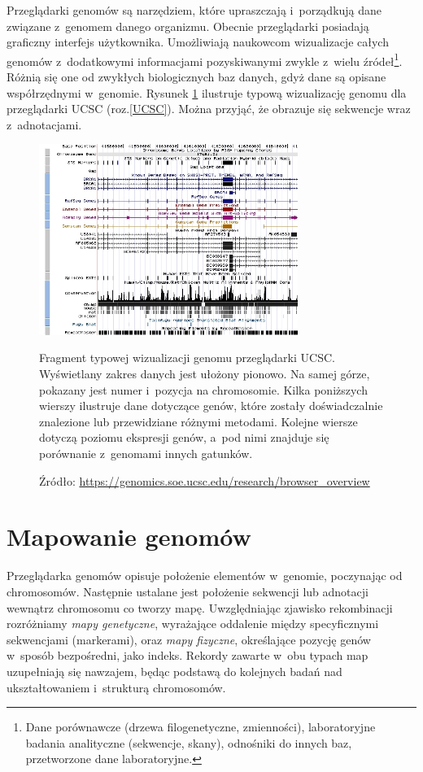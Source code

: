 \documentclass[a4paper,12pt,oneside]{mwrep}  %
\begin{document}
Przeglądarki genomów są narzędziem, które upraszczają i~porządkują dane związane z~genomem danego organizmu. Obecnie przeglądarki posiadają graficzny interfejs użytkownika. Umożliwiają naukowcom wizualizacje całych genomów z~dodatkowymi informacjami pozyskiwanymi zwykle z~wielu źródeł\footnote{Dane porównawcze (drzewa filogenetyczne, zmienności), laboratoryjne badania analityczne (sekwencje, skany), odnośniki do innych baz, przetworzone dane laboratoryjne.}. Różnią się one od zwykłych biologicznych baz danych, gdyż dane są opisane współrzędnymi w~genomie. Rysunek \ref{przykladowa-przegladarka-genomu} ilustruje typową wizualizację genomu dla przeglądarki UCSC (roz.\ref{UCSC}). Można przyjąć, że obrazuje się sekwencje wraz z~adnotacjami.

\begin{figure}[h]
\centering
\includegraphics[width=0.75\textwidth]{grafika/browsershot_ucsc}
\caption{Fragment typowej wizualizacji genomu przeglądarki UCSC. Wyświetlany zakres danych jest ułożony pionowo. Na samej górze, pokazany jest numer i~pozycja na chromosomie. Kilka poniższych wierszy ilustruje dane dotyczące genów, które zostały doświadczalnie znalezione lub przewidziane różnymi metodami. Kolejne wiersze dotyczą poziomu ekspresji genów, a~pod nimi znajduje się porównanie z~genomami innych gatunków.}
\vspace{-0.8cm}
\caption*{\scriptsize Źródło: \url{https://genomics.soe.ucsc.edu/research/browser_overview}}
\label{przykladowa-przegladarka-genomu}
\end{figure}

\section{Mapowanie genomów}
Przeglądarka genomów opisuje położenie elementów w~genomie, poczynając od chromosomów. Następnie ustalane jest położenie sekwencji lub adnotacji wewnątrz chromosomu co tworzy mapę. Uwzględniając zjawisko rekombinacji rozróżniamy \emph{mapy genetyczne}, wyrażające oddalenie między specyficznymi sekwencjami (markerami), oraz \emph{mapy fizyczne}, określające pozycję genów w~sposób bezpośredni, jako indeks. Rekordy zawarte w~obu typach map uzupełniają się nawzajem, będąc podstawą do kolejnych badań nad ukształtowaniem i~strukturą chromosomów. %
\end{document}
